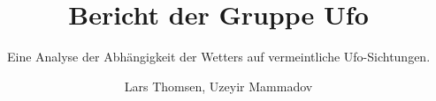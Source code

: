 \title{Bericht der Gruppe \glqq Ufo\glqq}
\subtitle{Eine Analyse der Abhängigkeit der Wetters auf vermeintliche Ufo-Sichtungen.}         %


\author{Lars Thomsen, Uzeyir Mammadov}

\begin{abstract}


\end{abstract}

\maketitle
